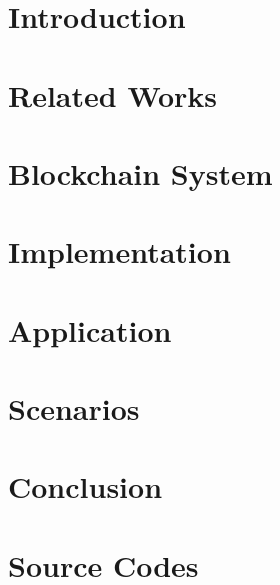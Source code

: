 \documentclass[12pt,twoside,openright]{report}
\makeatletter
\def\cleardoublepage{\clearpage\if@twoside \ifodd\c@page\else
    \hbox{}
    \thispagestyle{empty}
    \newpage
    \if@twocolumn\hbox{}\newpage\fi\fi\fi}
\makeatother
\begin{document}

\cleardoublepage


\cleardoublepage


\cleardoublepage


\cleardoublepage

\tableofcontents

\listoffigures
 
\listoftables

\listofalgorithms
{}

\renewcommand\lstlistlistingname{List of Configuration Files}
\lstlistoflistings
{}

\chapter{Introduction}


\chapter{Related Works}


\chapter{Blockchain System}


\chapter{Implementation}


\chapter{Application}


\chapter{Scenarios}


\chapter{Conclusion}





\appendix
\chapter{Source Codes}

\end{document}
